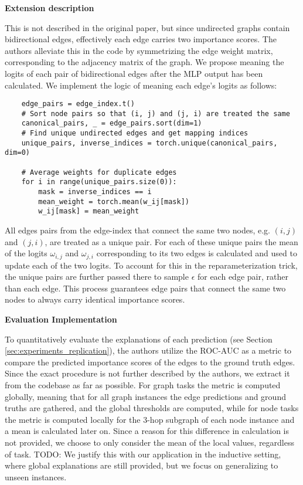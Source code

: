 \textbf{Extension description}\par
This is not described in the original paper, but since undirected graphs contain bidirectional edges, effectively each edge carries two importance scores. The authors alleviate this in the code by symmetrizing the edge weight matrix, corresponding to the adjacency matrix of the graph. We propose meaning the logits of each pair of bidirectional edges after the MLP output has been calculated. We implement the logic of meaning each edge's logits as follows: 
\begin{verbatim}
    edge_pairs = edge_index.t()
    # Sort node pairs so that (i, j) and (j, i) are treated the same
    canonical_pairs, _ = edge_pairs.sort(dim=1)
    # Find unique undirected edges and get mapping indices
    unique_pairs, inverse_indices = torch.unique(canonical_pairs, dim=0)
    
    # Average weights for duplicate edges
    for i in range(unique_pairs.size(0)):
        mask = inverse_indices == i
        mean_weight = torch.mean(w_ij[mask])
        w_ij[mask] = mean_weight
\end{verbatim}
All edges pairs from the edge-index that connect the same two nodes, e.g. $(i,j)$ and $(j,i)$, are treated as a unique pair. For each of these unique pairs the mean of the logits $\omega_{i,j}$ and $\omega_{j,i}$ corresponding to its two edges is calculated and used to update each of the two logits. To account for this in the reparameterization trick, the unique pairs are further passed there to sample $\epsilon$ for each edge pair, rather than each edge. This process guarantees edge pairs that connect the same two nodes to always carry identical importance scores. \bigskip

\textbf{Evaluation Implementation}\par
To quantitatively evaluate the explanations of each prediction (see Section \ref{sec:experiments_replication}), the authors utilize the ROC-AUC as a metric to compare the predicted importance scores of the edges to the ground truth edges. Since the exact procedure is not further described by the authors, we extract it from the codebase as far as possible. For graph tasks the metric is computed globally, meaning that for all graph instances the edge predictions and ground truths are gathered, and the global thresholds are computed, while for node tasks the metric is computed locally for the $3$-hop subgraph of each node instance and a mean is calculated later on.
Since a reason for this difference in calculation is not provided, we choose to only consider the mean of the local values, regardless of task. TODO: We justify this with our application in the inductive setting, where global explanations are still provided, but we focus on generalizing to unseen instances.

